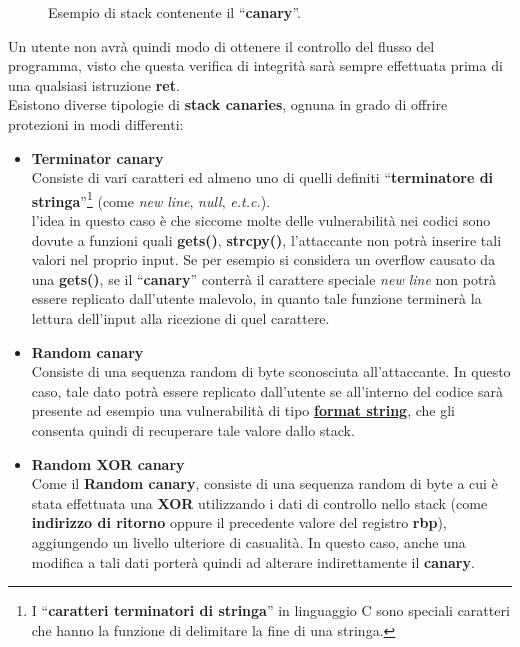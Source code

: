 \begin{figure}[htbp]
    \centerline{}
    \caption{Esempio di stack contenente il ``\textbf{canary}''.}
    \label{fig:canary}
\end{figure}
Un utente non avrà quindi modo di ottenere il controllo del flusso del programma, visto che questa verifica di integrità sarà sempre effettuata prima di una qualsiasi istruzione \textbf{ret}.\\
Esistono diverse tipologie di \textbf{stack canaries}, ognuna in grado di offrire protezioni in modi differenti: 
\begin{itemize}
    \item \textbf{Terminator canary} \\
    Consiste di vari caratteri ed almeno uno di quelli definiti ``\textbf{terminatore di stringa}''\footnote[1]{I ``\textbf{caratteri terminatori di stringa}'' in linguaggio C sono speciali caratteri che hanno la funzione di delimitare la fine di una stringa.} (come \textit{new line}, \textit{null}, \textit{e.t.c.}).\\
    l'idea in questo caso è che siccome molte delle vulnerabilità nei codici sono dovute a funzioni quali \textbf{gets()}, \textbf{strcpy()}, l'attaccante non potrà inserire tali valori nel proprio input. Se per esempio si considera un overflow causato da una \textbf{gets()}, se il ``\textbf{canary}'' conterrà il carattere speciale \textit{new line} non potrà essere replicato dall'utente malevolo, in quanto tale funzione terminerà la lettura dell'input alla ricezione di quel carattere.
    \item \textbf{Random canary} \\
    Consiste di una sequenza random di byte sconosciuta all'attaccante. In questo caso, tale dato potrà essere replicato dall'utente se all'interno del codice sarà presente ad esempio una vulnerabilità di tipo \hyperref[subsec:format string]{\textbf{format string}}, che gli consenta quindi di recuperare tale valore dallo stack.
    \item \textbf{Random XOR canary} \\
    Come il \textbf{Random canary}, consiste di una sequenza random di byte a cui è stata effettuata una \textbf{XOR} utilizzando i dati di controllo nello stack (come \textbf{indirizzo di ritorno} oppure il precedente valore del registro \textbf{rbp}), aggiungendo un livello ulteriore di casualità. In questo caso, anche una modifica a tali dati porterà quindi ad alterare indirettamente il \textbf{canary}.\\
\end{itemize}
